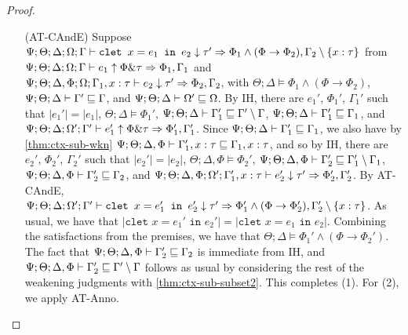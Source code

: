 \begin{proof}
\begin{itemize}
  \item[(AT-CAndE)] Suppose
  $\Psi ; \Theta ; \Delta ; \Omega ; \Gamma \vdash \texttt{clet } x = e_1 \texttt{ in } e_2 \downarrow \tau' \Rightarrow \Phi_1 \wedge (\Phi \to \Phi_2),\Gamma_2 \setminus \{x : \tau\}$ from
  $\Psi ; \Theta ; \Delta ; \Omega ; \Gamma \vdash e_1 \uparrow \Phi \& \tau \Rightarrow \Phi_1,\Gamma_1$ and
  $\Psi ; \Theta ; \Delta, \Phi ; \Omega ; \Gamma_1, x : \tau \vdash e_2 \downarrow \tau' \Rightarrow \Phi_2, \Gamma_2$, with
  $\Theta ; \Delta \vDash \Phi_1 \wedge (\Phi \to \Phi_2)$,
  $\Psi ; \Theta ; \Delta \vdash \Gamma' \sqsubseteq \Gamma$, and
  $\Psi ; \Theta ; \Delta \vdash \Omega' \sqsubseteq \Omega$.
  By IH, there are $e_1'$, $\Phi_1'$, $\Gamma_1'$ such that
  $|e_1'| = |e_1|$,
  $\Theta ; \Delta \vDash \Phi_1'$,
  $\Psi ; \Theta ; \Delta \vdash \Gamma_1' \sqsubseteq \Gamma' \setminus \Gamma$,
  $\Psi ; \Theta ; \Delta \vdash \Gamma_1' \sqsubseteq \Gamma_1$, and
  $\Psi ; \Theta ; \Delta ; \Omega' ; \Gamma' \vdash e_1' \uparrow \Phi \& \tau \Rightarrow \Phi_1',\Gamma_1'$.
  Since $\Psi ; \Theta ; \Delta \vdash \Gamma_1' \sqsubseteq \Gamma_1$, we also have by \autoref{thm:ctx-sub-wkn}
  $\Psi ; \Theta ; \Delta, \Phi \vdash \Gamma_1', x : \tau \sqsubseteq \Gamma_1, x : \tau$,
  and so by IH, there are $e_2'$, $\Phi_2'$, $\Gamma_2'$ such that
  $|e_2'| = |e_2|$,
  $\Theta ; \Delta, \Phi \vDash \Phi_2'$,
  $\Psi ; \Theta ; \Delta, \Phi \vdash \Gamma_2' \sqsubseteq \Gamma_1' \setminus \Gamma_1$,
  $\Psi ; \Theta ; \Delta, \Phi \vdash \Gamma_2' \sqsubseteq \Gamma_2$, and
  $\Psi ; \Theta ; \Delta, \Phi ; \Omega' ; \Gamma_1', x : \tau \vdash e_2' \downarrow \tau' \Rightarrow \Phi_2', \Gamma_2'$.
  By AT-CAndE,
  $\Psi ; \Theta ; \Delta ; \Omega' ; \Gamma' \vdash \texttt{clet } x = e_1' \texttt{ in } e_2' \downarrow \tau' \Rightarrow \Phi_1' \wedge (\Phi \to \Phi_2'),\Gamma_2' \setminus \{x : \tau\}$.
  As usual, we have that $|\texttt{clet } x = e_1' \texttt{ in } e_2'| = |\texttt{clet } x = e_1 \texttt{ in } e_2|$.
  Combining the satisfactions from the premises, we have that $\Theta ; \Delta \vDash \Phi_1' \wedge (\Phi \to \Phi_2')$.
  The fact that $\Psi ; \Theta ; \Delta, \Phi \vdash \Gamma_2' \sqsubseteq \Gamma_2$ is immediate from IH, 
  and $\Psi ; \Theta ; \Delta, \Phi \vdash \Gamma_2' \sqsubseteq \Gamma' \setminus \Gamma$ follows as usual by considering the rest
  of the weakening judgments with \autoref{thm:ctx-sub-subset2}. This completes (1). For (2), we apply AT-Anno.
   

\end{itemize}
\end{proof}
